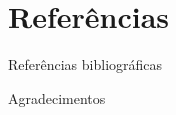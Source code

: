 \documentclass[xcolor=dvipsnames,t]{beamer}
\begin{document}
\section{Referências}
\begin{frame}{Referências bibliográficas}
	\tiny
	
\end{frame}
\begin{frame}
    \bigskip\bigskip\bigskip\bigskip\bigskip\bigskip
    \begin{center}
        \Huge Agradecimentos
    \end{center}
\end{frame}
\end{document}
